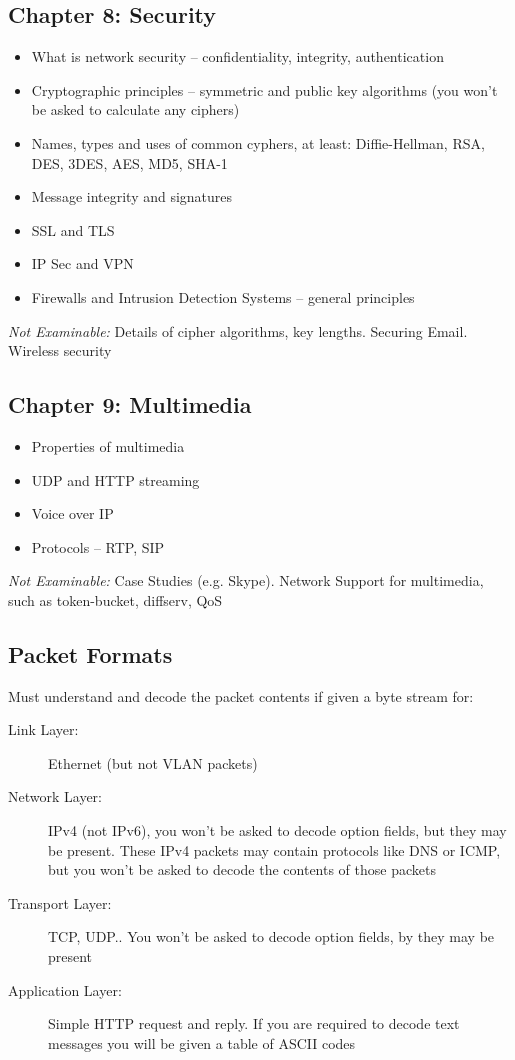 \documentclass[12pt, a4paper]{article}
\begin{document}
\begin{multicols*}{2}
	\subsection{Chapter 8: Security}
	\begin{itemize}
		\item What is network security -- confidentiality, integrity, authentication
		\item Cryptographic principles -- symmetric and public key algorithms (you won't be asked to calculate any ciphers)
		\item Names, types and uses of common cyphers, at least: Diffie-Hellman, RSA, DES, 3DES, AES, MD5, SHA-1
		\item Message integrity and signatures
		\item SSL and TLS
		\item IP Sec and VPN
		\item Firewalls and Intrusion Detection Systems -- general principles
	\end{itemize}
	\textit{Not Examinable:} Details of cipher algorithms, key lengths. Securing Email. Wireless security
	\subsection{Chapter 9: Multimedia}
	\begin{itemize}
		\item Properties of multimedia
		\item UDP and HTTP streaming
		\item Voice over IP
		\item Protocols -- RTP, SIP
	\end{itemize}
	\textit{Not Examinable:} Case Studies (e.g. Skype). Network Support for multimedia, such as token-bucket, diffserv, QoS
	\subsection{Packet Formats}
	Must understand and decode the packet contents if given a byte stream for:
	\begin{description}
		\item[Link Layer:] Ethernet (but not VLAN packets)
		\item[Network Layer:] IPv4 (not IPv6), you won't be asked to decode option fields, but they may be present. These IPv4 packets may contain protocols like DNS or ICMP, but you won't be asked to decode the contents of those packets
		\item[Transport Layer:] TCP, UDP.. You won't be asked to decode option fields, by they may be present
		\item[Application Layer:] Simple HTTP request and reply. If you are required to decode text messages you will be given a table of ASCII codes
	\end{description}
	\newpage
	

\end{multicols*}
\end{document}
